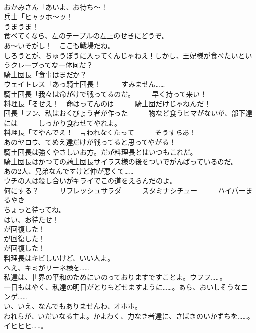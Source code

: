 \documentclass[8pt]{extreport}
\begin{document}
\begin{CJK}{UTF8}{min}
\\	おかみさん「あいよ、お待ち～！	
\\	兵士「ヒャッホ～ッ！	
\\	うまうま！	
\\	食べてくなら、左のテーブルの左上のせきにどうぞ。	
\\	あ～いそがし！　ここも戦場だね。	
\\	しろうとが、ちゅうぼうに入ってくんじゃねえ！しかし、王妃様が食べたいというクレープってな一体何だ？	
\\	騎土団長「食事はまだか？	
\\	ウェイトレス「あっ騎土団長！　　　すみません……	
\\	騎土団長「我々は命がけで戦ってるのだ。　　　早く持って来い！	
\\	料理長「るせえ！　命はってんのは　　　騎土団だけじゃねんだ！	
\\	団長「フン、私はおくびょう者が作った　　　物など食うヒマがないが、部下達には　　　しっかり食わせてやれよ。	
\\	料理長「てやんでえ！　言われなくたって　　　そうすらあ！	
\\	あのヤロウ、てめえ達だけが戦ってると思ってやがる！	
\\	騎土団長は強くやさしいお方。だが料理長とはいつもこれだ。	
\\	騎土団長はかつての騎土団長サイラス様の後をついでがんばっているのだ。	
\\	あの2人、兄弟なんですけど仲が悪くて……	
\\	ウチの人は殺し合いがキライでこの道をえらんだのよ。	
\\	何にする？　　　リフレッシュサラダ　　　スタミナシチュー　　　ハイパーまるやき	
\\	ちょっと待ってね。	
\\	はい、お待たせ！	
\\	が回復した！	
\\	が回復した！	
\\	が回復した！	
\\	料理長はキビしいけど、いい人よ。	
\\	へえ、キミがリーネ様を……	
\\	私達は、世界の平和のためにいのっておりますですことよ。ウフフ……。	
\\	一日もはやく、私達の明日がとりもどせますように……。あら、おいしそうなニンゲ……	
\\	い、いえ、なんでもありませんわ、オホホ。	
\\	われらが、いだいなる主よ。かよわく、力なき者達に、さばきのいかずちを……。　イヒヒヒ……。	

\end{CJK}
\end{document}
